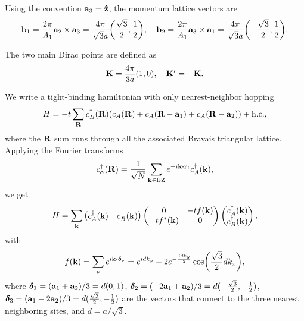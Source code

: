 \documentclass[a4paper,12pt]{report}
\begin{document}
Using the convention ${\vb{a}}_3 = \vu{z}$, the momentum lattice vectors are
\begin{equation} \label{eq:monolayer-bvecs}
{\vb{b}}_1 = \frac{2\pi}{A_1} {\vb{a}}_2 \times {\vb{a}}_3 = \frac{4\pi}{\sqrt{3} a } \qty(\frac{\sqrt{3}}{2}, \frac{1}{2}), \quad
{\vb{b}}_2 = \frac{2\pi}{A_1} {\vb{a}}_3 \times {\vb{a}}_1 = \frac{4\pi}{\sqrt{3} a } \qty(-\frac{\sqrt{3}}{2}, \frac{1}{2}).
\end{equation}

The two main Dirac points are defined as
\begin{equation} \label{eq:monolayer-dirac-points}
{\vb{K}} = \frac{4\pi}{3a} (1, 0) , \quad {\vb{K}}' = -{\vb{K}}.
\end{equation}



We write a tight-binding hamiltonian with only nearest-neighbor hopping
\begin{equation} \label{eq:monolayer-tight-binding}
H = -t \sum_{{\vb{R}}} c^{\dagger}_B({\vb{R}}) \qty(c_A({\vb{R}}) + c_A({\vb{R}}-{\vb{a}}_1) + c_A({\vb{R}}-{\vb{a}}_2)) + {\text{h.c.}},
\end{equation}
where the ${\vb{R}}$ sum runs through all the associated Bravais triangular lattice. Applying the Fourier transforms
\begin{equation} \label{eq:monolayer-fourier}
c_{\alpha}^\d(\R) = \frac{1}{\sqrt{N}} \sum_{\k \in \text{BZ}} e^{-i \k \vdot \r_i} c_A^\d(\k),
\end{equation}
we get
\begin{equation} \label{eq:monolayer-tight-binding2}
H = \sum_{{\vb{k}}}
\begin{pmatrix}
c_A^{\dagger}({\vb{k}}) & c_B^{\dagger}({\vb{k}})
\end{pmatrix}
\begin{pmatrix}
0 & -t f({\vb{k}}) \\
-t f^*({\vb{k}}) & 0
\end{pmatrix}
\begin{pmatrix}
c_A^{\dagger}({\vb{k}}) \\ c_B^{\dagger}({\vb{k}})
\end{pmatrix},
\end{equation}
with
\begin{equation} \label{eq:monolayer-fk}
f(\k) = \sum_{\nu} e^{i \k \vdot \bm{\delta}_\nu} =
e^{idk_y} + 2 e^{-\frac{idk_y}{2}} \cos(\frac{\sqrt{3}}{2} dk_x),
\end{equation}
where $\bm{\delta}_1 = ({\vb{a}}_1 + {\vb{a}}_2)/3 = d (0, 1)$, $\bm{\delta}_2 = (-2{\vb{a}}_1 + {\vb{a}}_2)/3 = d(-\frac{\sqrt{3}}{2}, -\frac{1}{2})$, $\bm{\delta}_3 = ({\vb{a}}_1 - 2{\vb{a}}_2)/3 = d (\frac{\sqrt{3}}{2}, -\frac{1}{2})$ are the vectors that connect to the three nearest neighboring sites, and $d = a/\sqrt{3}$.
\end{document}
